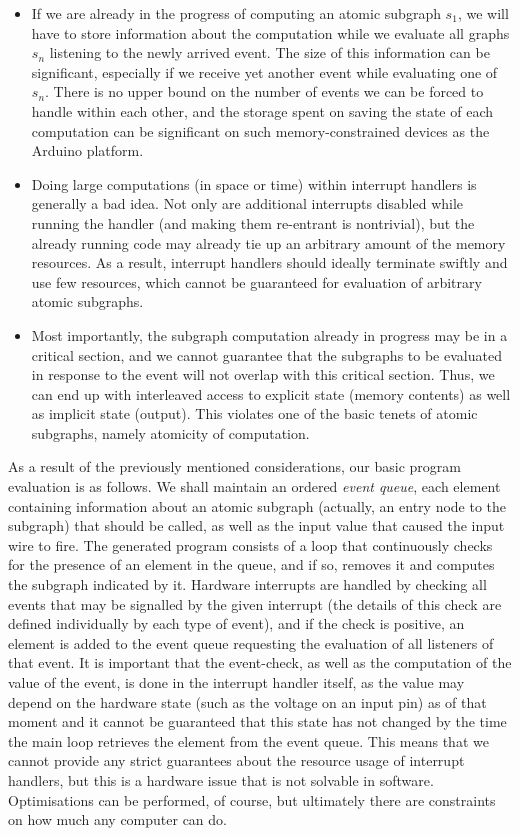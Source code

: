 \documentclass[a4paper, oneside, final]{memoir}
\begin{document}
\begin{itemize}
\item If we are already in the progress of computing an atomic
  subgraph $s_1$, we will have to store information about the
  computation while we evaluate all graphs $s_n$ listening to the
  newly arrived event.  The size of this information can be
  significant, especially if we receive yet another event while
  evaluating one of $s_n$.  There is no upper bound on the number of
  events we can be forced to handle within each other, and the storage
  spent on saving the state of each computation can be significant on
  such memory-constrained devices as the Arduino platform.
\item Doing large computations (in space or time) within interrupt
  handlers is generally a bad idea.  Not only are additional
  interrupts disabled while running the handler (and making them
  re-entrant is nontrivial), but the already running code may already
  tie up an arbitrary amount of the memory resources.  As a result,
  interrupt handlers should ideally terminate swiftly and use few
  resources, which cannot be guaranteed for evaluation of arbitrary
  atomic subgraphs.
\item Most importantly, the subgraph computation already in progress
  may be in a critical section, and we cannot guarantee that the
  subgraphs to be evaluated in response to the event will not overlap
  with this critical section.  Thus, we can end up with interleaved
  access to explicit state (memory contents) as well as implicit state
  (output).  This violates one of the basic tenets of atomic
  subgraphs, namely atomicity of computation.
\end{itemize}

As a result of the previously mentioned considerations, our basic
program evaluation is as follows.  We shall maintain an ordered
\textit{event queue}, each element containing information about an
atomic subgraph (actually, an entry node to the subgraph) that should
be called, as well as the input value that caused the input wire to
fire.  The generated program consists of a loop that continuously
checks for the presence of an element in the queue, and if so, removes
it and computes the subgraph indicated by it.  Hardware interrupts are
handled by checking all events that may be signalled by the given
interrupt (the details of this check are defined individually by each
type of event), and if the check is positive, an element is added to
the event queue requesting the evaluation of all listeners of that
event.  It is important that the event-check, as well as the
computation of the value of the event, is done in the interrupt
handler itself, as the value may depend on the hardware state (such as
the voltage on an input pin) as of that moment and it cannot be
guaranteed that this state has not changed by the time the main loop
retrieves the element from the event queue.  This means that we cannot
provide any strict guarantees about the resource usage of interrupt
handlers, but this is a hardware issue that is not solvable in
software.  Optimisations can be performed, of course, but ultimately
there are constraints on how much any computer can do.
\end{document}
